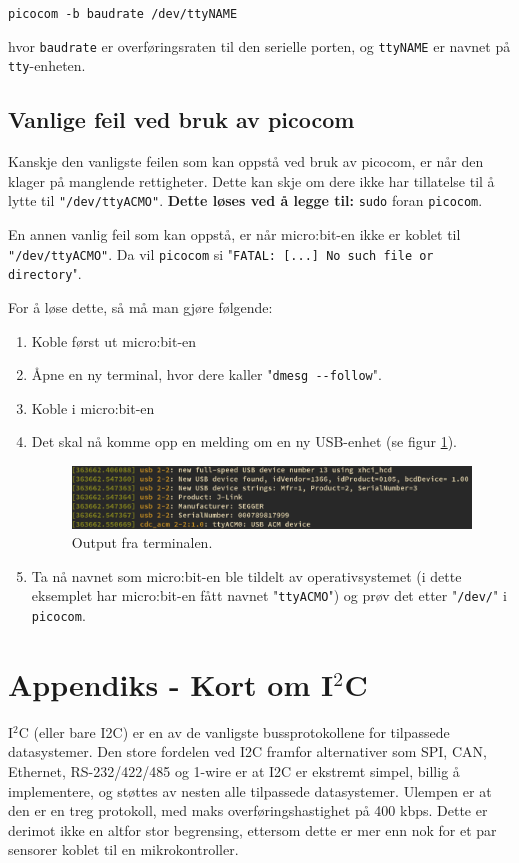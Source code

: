 \verb|picocom -b baudrate /dev/ttyNAME|

hvor \verb|baudrate| er overføringsraten til den serielle porten, og \verb|ttyNAME| er navnet på \verb|tty|-enheten.

\subsection{Vanlige feil ved bruk av picocom}
Kanskje den vanligste feilen som kan oppstå ved bruk av picocom, er når den klager på manglende rettigheter. Dette kan skje om dere ikke har tillatelse til å lytte til \verb|"/dev/ttyACMO"|. \textbf{Dette løses ved å legge til:} \verb|sudo| foran \verb|picocom|.

En annen vanlig feil som kan oppstå, er når micro:bit-en ikke er koblet til \verb|"/dev/ttyACMO"|. Da vil \verb|picocom| si "\verb|FATAL: [...] No such file or directory|".

For å løse dette, så må man gjøre følgende:
\begin{enumerate}
    \item Koble først ut micro:bit-en
    \item Åpne en ny terminal, hvor dere kaller "\verb|dmesg --follow|".
    \item Koble i micro:bit-en
    \item Det skal nå komme opp en melding om en ny USB-enhet (se figur \ref{fig:picocom-terminal-output}).
    \begin{figure}[ht]
        \centering
       \includegraphics[scale=0.4]{figures/picocom.JPG}
        \caption{Output fra terminalen.}
        \label{fig:picocom-terminal-output}
    \end{figure}
    
    \item Ta nå navnet som micro:bit-en ble tildelt av operativsystemet (i dette eksemplet har micro:bit-en fått navnet "\verb|ttyACMO|") og prøv det etter "\verb|/dev/|" i \verb|picocom|.
    
\end{enumerate}

\cprotect\section{Appendiks - Kort om I$^2$C}\label{app:TWI}
I$^2$C (eller bare I2C) er en av de vanligste bussprotokollene for tilpassede datasystemer. Den store fordelen ved I2C framfor alternativer som SPI, CAN, Ethernet, RS-232/422/485 og 1-wire er at I2C er ekstremt simpel, billig å implementere, og støttes av nesten alle tilpassede datasystemer. Ulempen er at den er en treg protokoll, med maks overføringshastighet på 400 kbps. Dette er derimot ikke en altfor stor begrensing, ettersom dette er mer enn nok for et par sensorer koblet til en mikrokontroller.

